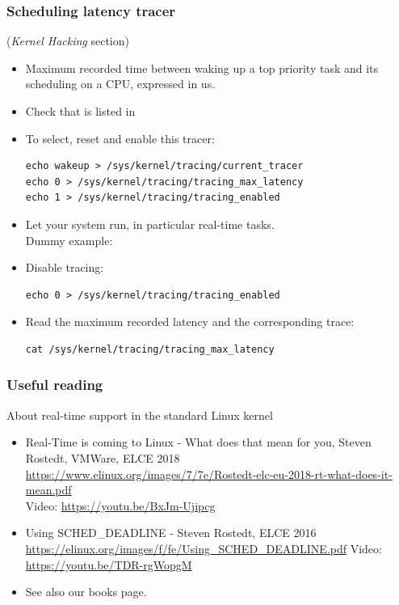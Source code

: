 \begin{frame}[fragile]
  \frametitle{Scheduling latency tracer}
  \fontsize{9}{9}\selectfont
   ({\em Kernel Hacking} section)
  \begin{itemize}
  \item Maximum recorded time between waking up a top priority task
    and its scheduling on a CPU, expressed in us.
  \item Check that  is listed in
  \item To select, reset and enable this tracer:
    \begin{block}{}
\begin{verbatim}
echo wakeup > /sys/kernel/tracing/current_tracer
echo 0 > /sys/kernel/tracing/tracing_max_latency
echo 1 > /sys/kernel/tracing/tracing_enabled
\end{verbatim}
    \end{block}
  \item Let your system run, in particular real-time tasks.\\
    Dummy example: 
  \item Disable tracing:\\
    \begin{block}{}
\begin{verbatim}
echo 0 > /sys/kernel/tracing/tracing_enabled
\end{verbatim}
    \end{block}{}
  \item Read the maximum recorded latency and the corresponding trace:\\
    \begin{block}{}
\begin{verbatim}
cat /sys/kernel/tracing/tracing_max_latency
\end{verbatim}
    \end{block}{}
  \end{itemize}
\end{frame}

\begin{frame}
  \frametitle{Useful reading}
  About real-time support in the standard Linux kernel
  \begin{itemize}
  \item Real-Time is coming to Linux - What does that mean for you, Steven Rostedt, VMWare, ELCE 2018\\
    	\url{https://www.elinux.org/images/7/7e/Rostedt-elc-eu-2018-rt-what-does-it-mean.pdf}\\
    	Video: \url{https://youtu.be/BxJm-Ujipcg}
  \item Using SCHED\_DEADLINE - Steven Rostedt, ELCE 2016\\
	{\small \url{https://elinux.org/images/f/fe/Using_SCHED_DEADLINE.pdf}}
	Video: \url{https://youtu.be/TDR-rgWopgM}
  \item See also our books page.
  \end{itemize}
\end{frame}

